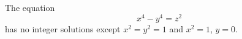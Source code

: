 \begin{proposition}\label{eq:150}
    The equation
\[
    x^4-y^4=z^2
\]
    has no integer solutions except $x^2=y^2=1$ and $x^2=1$, $y=0$.
\end{proposition}
